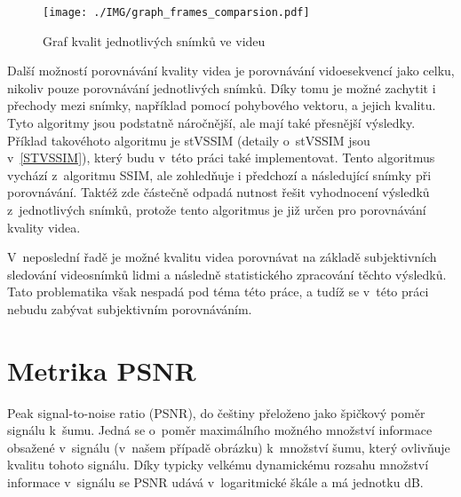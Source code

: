 \documentclass[thesis=M,czech]{FITthesis}[2016/06/26]
\begin{document}
\begin{figure}\centering
\texttt{[image: ./IMG/graph\_frames\_comparsion.pdf]}
\caption{Graf kvalit jednotlivých snímků ve videu}
\label{fig:frames_comparsion}
\end{figure}


Další možností porovnávání kvality videa je porovnávání vidoesekvencí jako celku, nikoliv pouze porovnávání jednotlivých snímků. Díky tomu je možné zachytit i přechody mezi snímky, například pomocí pohybového vektoru, a jejich kvalitu. Tyto algoritmy jsou podstatně náročnější, ale mají také přesnější výsledky. Příklad takovéhoto algoritmu je stVSSIM (detaily o~stVSSIM jsou v~\autoref{STVSSIM}), který budu v~této práci také implementovat. Tento algoritmus vychází z~algoritmu SSIM, ale zohledňuje i předchozí a následující snímky při porovnávání. Taktéž zde částečně odpadá nutnost řešit vyhodnocení výsledků z~jednotlivých snímků, protože tento algoritmus je již určen pro porovnávání kvality videa.

V~neposlední řadě je možné kvalitu videa porovnávat na základě subjektivních sledování videosnímků lidmi a následně statistického zpracování těchto výsledků. Tato problematika však nespadá pod téma této práce, a tudíž se v~této práci nebudu zabývat subjektivním porovnáváním.

\section{Metrika PSNR}\label{PSNR}
Peak signal-to-noise ratio (PSNR), do češtiny přeloženo jako špičkový poměr signálu k~šumu\cite{PSNR}. Jedná se o~poměr maximálního možného množství informace obsažené v~signálu (v~našem případě obrázku) k~množství šumu, který ovlivňuje kvalitu tohoto signálu. Díky typicky velkému dynamickému rozsahu množství informace v~signálu se PSNR udává v~logaritmické škále a má jednotku dB.
\end{document}
